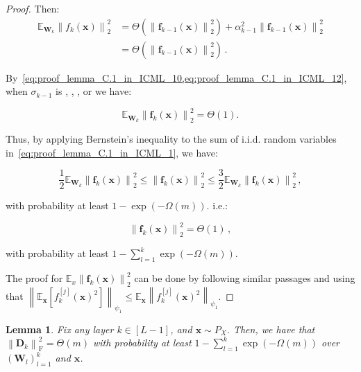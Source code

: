 \documentclass[nohyperref]{article}
\theoremstyle{plain}
\newtheorem{lemma}{Lemma}
\theoremstyle{definition}
\theoremstyle{remark}
\begin{document}
\begin{proof}
Then:
\begin{equation}
\begin{split}
    \mathbb{E}_{\bm{W}_k} \left \| f_k(\bm{x}) \right \|_2^2 & = \Theta(\left \| \bm{f}_{k-1}(\bm{x}) \right \|_2^2) + \alpha_{k-1}^2\left \| \bm{f}_{k-1}(\bm{x}) \right \|_2^2\\
    & = \Theta(\left \| \bm{f}_{k-1}(\bm{x}) \right \|_2^2)\,.
\end{split}
\label{eq:proof_lemma_C.1_in_ICML_12}
\end{equation}

By~\cref{eq:proof_lemma_C.1_in_ICML_10,eq:proof_lemma_C.1_in_ICML_12}, when $\sigma_{k-1}$ is , , ,  or  we have:

\begin{equation*}
    \mathbb{E}_{\bm{W}_k} \left \| \bm{f}_k(\bm{x}) \right \|_2^2 =\Theta(1).
\end{equation*}

Thus, by applying Bernstein’s inequality to the sum of i.i.d. random variables in~\cref{eq:proof_lemma_C.1_in_ICML_1}, we have:

\begin{equation*}
\frac{1}{2} \mathbb{E}_{\bm{W}_k} \left \| \bm{f}_k(\bm{x}) \right \| _2^2 \leq \left \| \bm{f}_k(\bm{x}) \right \| _2^2 \leq \frac{3}{2} \mathbb{E}_{\bm{W}_k} \left \| \bm{f}_k(\bm{x}) \right \| _2^2\,,
\end{equation*}

with probability at least $1- \exp(-\Omega (m))$. i.e.:

\begin{equation*}
\left \| \bm{f}_{k}(\bm{x}) \right \|_2^2 = \Theta (1)\,,
\end{equation*}

with probability at least $1-\sum_{l=1}^{k}\exp(-\Omega (m))$.

The proof for $ \mathbb{E}_{x} \left \| \bm{f}_k(\bm{x}) \right \|_2^2$ can be done by following similar passages and using that $\left \| \mathbb{E}_{\bm{x}}[f_{k}^{[j]}(\bm{x})^2] \right \|_{\psi_1} \leq \mathbb{E}_{\bm{x}} \left \| f_{k}^{[j]}(\bm{x})^2 \right \|_{\psi_1}$.
\end{proof}

\begin{lemma}
\label{lemma:lemma_C.5_in_ICML}
Fix any layer $k \in [L-1]$, and $\bm{x}\sim P_X$. Then, we have that $\left \| \bm{D}_k \right \|_{\mathrm{F}}^2 = \Theta (m)$ with probability at least $1-\sum_{l=1}^{k}\exp(-\Omega (m))$ over $(\bm{W}_l)_{l=1}^k$ and $\bm{x}$.
\end{lemma}
\end{document}
